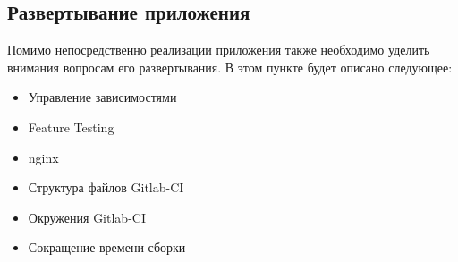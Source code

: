 \subsection{\large{Развертывание приложения}}

Помимо непосредственно реализации приложения также необходимо уделить внимания вопросам его развертывания.
В этом пункте будет описано следующее:
\begin{itemize}
    \item Управление зависимостями
    \item Feature Testing
    \item nginx
    \item Структура файлов Gitlab-CI
    \item Окружения Gitlab-CI
    \item Сокращение времени сборки
\end{itemize}
